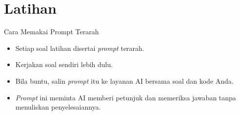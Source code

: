 \documentclass[aspectratio=169, table]{beamer}
\begin{document}
\section{Latihan}
\begin{frame}{Cara Memakai Prompt Terarah}
\begin{itemize}
\item Setiap soal latihan disertai \textit{prompt} terarah.
\item Kerjakan soal sendiri lebih dulu.
\item Bila buntu, salin \textit{prompt} itu ke layanan AI bersama soal dan kode Anda.
\item \textit{Prompt} ini meminta AI memberi petunjuk dan memeriksa jawaban tanpa menuliskan penyelesaiannya.
\end{itemize}
\end{frame}
\end{document}
